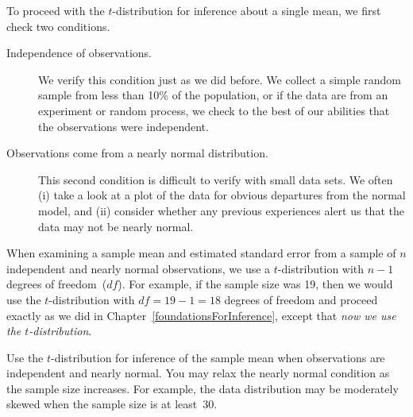 To proceed with the $t$-distribution for inference about a single mean, we first check two conditions.
\begin{description}
\item[Independence of observations.] We verify this condition just as we did before. We collect a simple random sample from less than 10\% of the population, or if the data are from an experiment or random process, we check to the best of our abilities that the observations were independent.
\item[Observations come from a nearly normal distribution.] This second condition is difficult to verify with small data sets. We often (i) take a look at a plot of the data for obvious departures from the normal model, and (ii) consider whether any previous experiences alert us that the data may not be nearly normal.
\end{description}
When examining a sample mean and estimated standard error from a sample of $n$ independent and nearly normal observations, we use a $t$-distribution with $n-1$ degrees of freedom~($df$). For example, if the sample size was 19, then we would use the $t$-distribution with $df=19-1=18$ degrees of freedom and proceed exactly as we did in Chapter~\ref{foundationsForInference}, except that \emph{now we use the $t$-distribution}.

\begin{tipBox}{
Use the $t$-distribution for inference of the sample mean when observations are independent and nearly normal. You may relax the nearly normal condition as the sample size increases. For example, the data distribution may be moderately skewed when the sample size is at least~30.}
\end{tipBox}

